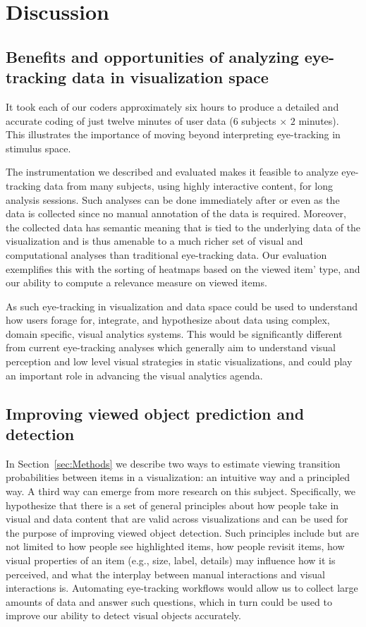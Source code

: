 ﻿\section{Discussion}
\label{sec:Discussion}
\subsection{Benefits and opportunities of analyzing eye-tracking data in visualization space}

It took each of our coders approximately six hours to produce a detailed and accurate coding of just twelve minutes of user data ($6$ subjects $\times$ $2$ minutes). This illustrates the importance of moving beyond interpreting eye-tracking in stimulus space.

The instrumentation we described and evaluated makes it feasible to analyze eye-tracking data from many subjects, using highly interactive content, for long analysis sessions. Such analyses can be done immediately after or even as the data is collected since no manual annotation of the data is required. Moreover, the collected data has semantic meaning that is tied to the underlying data of the visualization and is thus amenable to a much richer set of visual and computational analyses than traditional eye-tracking data. Our evaluation exemplifies this with the sorting of heatmaps based on the viewed item' type, and our ability to compute a relevance measure on viewed items. 

As such eye-tracking in visualization and data space could be used to understand how users forage for, integrate, and hypothesize about data using complex, domain specific, visual analytics systems. This would be significantly different from current eye-tracking analyses which generally aim to understand visual perception and low level visual strategies in static visualizations, and could play an important role in advancing the visual analytics agenda. 

\subsection{Improving viewed object prediction and detection} 

In Section~\ref{sec:Methods} we describe two ways to estimate viewing transition probabilities between items in a visualization: an intuitive way and a principled way. A third way can emerge from more research on this subject. Specifically, we hypothesize that there is a set of general principles about how people take in visual and data content that are valid across visualizations and can be used for the purpose of improving viewed object detection. Such principles include but are not limited to how people see highlighted items, how people revisit items, how visual properties of an item (e.g., size, label, details) may influence how it is perceived, and what the interplay between manual interactions and visual interactions is. Automating eye-tracking workflows would allow us to collect large amounts of data and answer such questions, which in turn could be used to improve our ability to detect visual objects accurately.  


